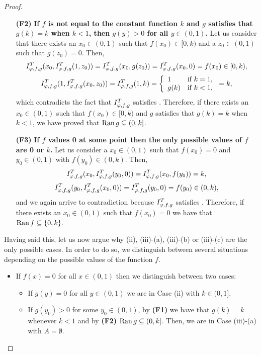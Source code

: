 \begin{proof}
\begin{enumerate}
\begin{itemize}
\begin{enumerate}
\begin{eqnarray*}
				g(k) &=& \IT(1,k)=\IT(1,\IT(y_0,y_0))=\IT(y_0,\IT(1,y_0)) \\
				&=&\IT(y_0,g(y_0))=k,
				\end{eqnarray*}
				and we obtain that $g(k)=k$.
				\item[\bf (F2)] \textbf{If $f$ is not equal to the constant function $k$ and $g$ satisfies that $g(k)=k$ when $k<1$, then $g(y)>0$ for all $y \in (0,1)$.}
				Let us consider that there exists an $x_0 \in (0,1)$ such that $f(x_0) \in [0,k)$ and a $z_0 \in (0,1)$ such that $g(z_0)=0$. Then,
				$$I^T_{\varphi,f,g}(x_0,I^T_{\varphi,f,g}(1,z_0))=I^T_{\varphi,f,g}(x_0,g(z_0)) =I^T_{\varphi,f,g}(x_0,0)=f(x_0)\in [0,k),$$
				$$ I^T_{\varphi,f,g}(1,I^T_{\varphi,f,g}(x_0,z_0))=I^T_{\varphi,f,g}(1,k)=\left\{ \begin{array}{ll}
					1 &   \text{if }   k=1, \\
					g(k) & \text{if }k < 1,
				\end{array}
				\right.=k,$$
				which contradicts the fact that $I^T_{\varphi,f,g}$ satisfies \EP. Therefore, if there exists an $x_0 \in (0,1)$ such that $f(x_0)\in [0,k)$ and $g$ satisfies that $g(k)=k$ when $k<1$, we have proved that $\operatorname{Ran} g \subseteq (0,k]$.
				\item[\bf (F3)]\textbf{If $f$ values 0 at some point then the only possible values of $f$ are 0 or $k$.} Let us consider a $x_0 \in (0,1)$ such that $f(x_0)=0$ and $y_0 \in (0,1)$ with $f(y_0) \in (0,k)$. Then,
				$$I^T_{\varphi,f,g}(x_0,I^T_{\varphi,f,g}(y_0,0))=I^T_{\varphi,f,g}(x_0,f(y_0))=k,$$
				$$I^T_{\varphi,f,g}(y_0,I^T_{\varphi,f,g}(x_0,0))=I^T_{\varphi,f,g}(y_0,0)=f(y_0) \in (0,k),$$
				and we again arrive to contradiction because $I^T_{\varphi,f,g}$ satisfies \EP. Therefore, if there exists an $x_0 \in (0,1)$ such that $f(x_0)=0$ we have that $\operatorname{Ran} f \subseteq \{0,k\}$.
			\end{enumerate}
			Having said this, let us now argue why (ii), (iii)-(a), (iii)-(b) or (iii)-(c) are the only possible cases. In order to do so, we distinguish between several situations depending on the possible values of the function $f$.
			\begin{itemize}
				\item If $f(x)=0$ for all $x \in (0,1)$ then we distinguish between two cases:
				\begin{itemize}
					\item If $g(y)=0$ for all $y \in (0,1)$ we are in Case (ii) with $k \in (0,1]$.
					\item If $g(y_0) > 0 $ for some $y_0 \in (0,1)$, by {\bf (F1)} we have that $g(k)=k$ whenever $k < 1$ and by {\bf (F2)} $\operatorname{Ran} g \subseteq (0,k]$. Then, we are in Case (iii)-(a) with $A=\emptyset$.
				\end{itemize}

\end{itemize}
\end{itemize}
\end{enumerate}
\end{proof}
